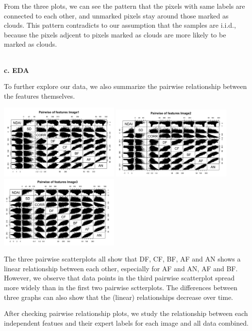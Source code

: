 \documentclass[11pt]{article}
\begin{document}
From the three plots, we can see the pattern that the pixels with same labels are connected to each other, and unmarked pixels stay around those marked as clouds. This pattern contradicts to our assumption that the samples are i.i.d., because the pixels adjcent to pixels marked as clouds are more likely to be marked as clouds.


\vspace{0.3cm}
\mbox{}\\
\textbf{c. EDA}

To further explore our data, we also summarize the pairwise relationship between the features themselves.

\includegraphics[width = 6cm]{1(c)image1.png}
\includegraphics[width = 6cm]{1(c)image2.png}
\includegraphics[width = 6cm]{1(c)image3.png}

The three pairwise scatterplots all show that DF, CF, BF, AF and AN shows a linear relationship between each other, especially for AF and AN, AF and BF. However, we observe that data points in the third pairwise scatterplot spread more widely than in the first two pairwise sctterplots. The differences between three graphs can also show that the (linear) relationships decrease over time.

After checking pairwise relationship plots, we study the relationship between each independent featues and their expert labels for each image and all data combined.
\end{document}
